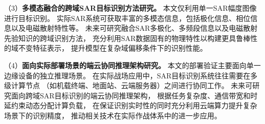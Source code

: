 （3）\textbf{多模态融合的跨域SAR目标识别方法研究。}
本文仅利用单一SAR幅度图像进行目标识别。
实际SAR系统可获取丰富的多模态信息，包括极化信息、相位信息以及电磁散射特性等。
未来可研究融合SAR多极化、多频段信息以及电磁散射先验知识的跨域识别方法，
充分利用SAR数据固有的物理特性以构建更具鲁棒性的域不变特征表示，
提升模型在复杂域偏移条件下的识别性能。

（4）\textbf{面向实际部署场景的端云协同推理架构研究。}
本文的部署验证主要面向单一边缘设备的独立推理场景。
在实际战场应用中，SAR目标识别系统往往需要在多级计算节点
（如机载终端、地面站、云端服务器）之间进行协同工作。
未来可研究面向跨域SAR目标识别的端云协同推理架构，
根据任务复杂度、通信带宽和时延约束动态分配计算负载，
在保证识别实时性的同时充分利用云端算力提升复杂场景下的识别精度，
推动相关技术在实际作战体系中的进一步应用。
